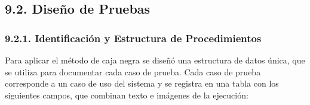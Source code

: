 \subsection{9.2. Diseño de Pruebas}\label{sec:cap9_diseno}


\subsubsection{9.2.1. Identificación y Estructura de Procedimientos}\label{sec:cap9_procedimientos}

Para aplicar el método de caja negra se diseñó una estructura de datos única, que se utiliza para documentar cada caso de prueba. Cada caso de prueba corresponde a un caso de uso del sistema y se registra en una tabla con los siguientes campos, que combinan texto e imágenes de la ejecución:

